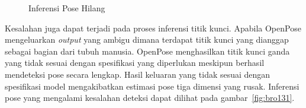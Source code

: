 \begin{figure}[htbp]
    \begin{center}
    \end{center}
    \vspace{-20pt}
    \captionsetup{labelfont=bf, textfont=bf}
    \caption{Inferensi Pose Hilang}
    \vspace{-10pt}
    \captionsetup{labelfont=md, textfont=md}
    \label{fig:bro76}
\end{figure}

Kesalahan juga dapat terjadi pada proses inferensi titik kunci. Apabila OpenPose mengeluarkan
\textit{output} yang ambigu dimana terdapat titik kunci yang dianggap sebagai bagian dari tubuh manusia.
OpenPose menghasilkan titik kunci ganda yang tidak sesuai dengan spesifikasi yang diperlukan meskipun
berhasil mendeteksi pose secara lengkap.
Hasil keluaran yang tidak sesuai dengan spesifikasi model mengakibatkan estimasi pose tiga dimensi yang rusak.
Inferensi pose yang mengalami kesalahan deteksi dapat dilihat pada gambar~\ref{fig:bro131}.

